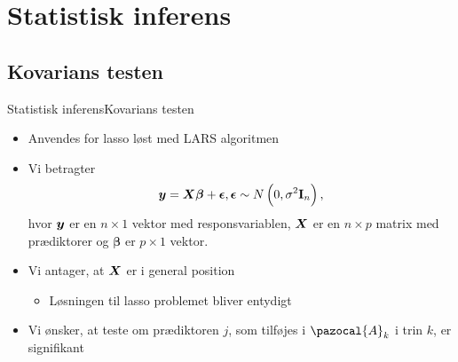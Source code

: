 \section{Statistisk inferens}
\subsection{Kovarians testen}
\begin{frame}{Statistisk inferens}{Kovarians testen}
\begin{itemize}
\item Anvendes for lasso løst med LARS algoritmen
\item Vi betragter 
\begin{align*}
\vy = \vX \boldsymbol \beta + \boldsymbol \epsilon, \boldsymbol \epsilon \sim N\del{0, \sigma^2 \textbf{I}_n},
\end{align*}
hvor $\bm{y}$ er en $n \times 1$ vektor med responsvariablen, $\bm{X}$ er en $n \times p$ matrix med prædiktorer og $\boldsymbol \beta$ er $p \times 1$ vektor.
\item Vi antager, at $\bm{X}$ er i general position
\begin{itemize}
\item Løsningen til lasso problemet bliver entydigt
\end{itemize}
\item Vi ønsker, at teste om prædiktoren $j$, som tilføjes i $\pazocal{A}_k$ i trin $k$, er signifikant
\end{itemize}
\end{frame}

